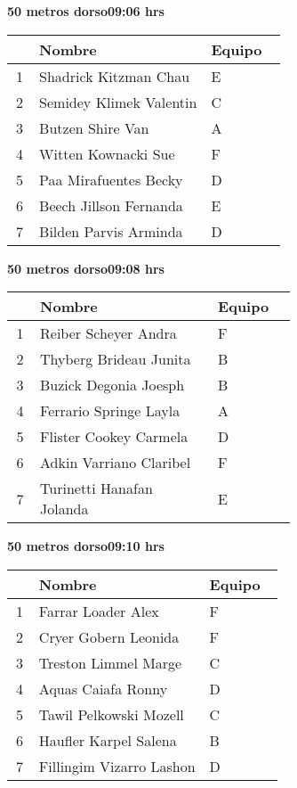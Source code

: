 \begin{minipage}{0.95\linewidth}
\begin{center}
\textbf{
50 metros dorso\hspace{1cm}09:06 hrs}
\end{center}
\begin{tabular}{cp{0.63\linewidth}l}
\hline
& \textbf{Nombre} & \textbf{Equipo} \\ \hline
1 & Shadrick Kitzman Chau & E \\ 
2 & Semidey Klimek Valentin & C \\ 
3 & Butzen Shire Van & A \\ 
4 & Witten Kownacki Sue & F \\ 
5 & Paa Mirafuentes Becky & D \\ 
6 & Beech Jillson Fernanda & E \\ 
7 & Bilden Parvis Arminda & D \\ 
\end{tabular}
\end{minipage}
\begin{minipage}{0.95\linewidth}
\begin{center}
\textbf{
50 metros dorso\hspace{1cm}09:08 hrs}
\end{center}
\begin{tabular}{cp{0.63\linewidth}l}
\hline
& \textbf{Nombre} & \textbf{Equipo} \\ \hline
1 & Reiber Scheyer Andra & F \\ 
2 & Thyberg Brideau Junita & B \\ 
3 & Buzick Degonia Joesph & B \\ 
4 & Ferrario Springe Layla & A \\ 
5 & Flister Cookey Carmela & D \\ 
6 & Adkin Varriano Claribel & F \\ 
7 & Turinetti Hanafan Jolanda & E \\ 
\end{tabular}
\end{minipage}
\begin{minipage}{0.95\linewidth}
\begin{center}
\textbf{
50 metros dorso\hspace{1cm}09:10 hrs}
\end{center}
\begin{tabular}{cp{0.63\linewidth}l}
\hline
& \textbf{Nombre} & \textbf{Equipo} \\ \hline
1 & Farrar Loader Alex & F \\ 
2 & Cryer Gobern Leonida & F \\ 
3 & Treston Limmel Marge & C \\ 
4 & Aquas Caiafa Ronny & D \\ 
5 & Tawil Pelkowski Mozell & C \\ 
6 & Haufler Karpel Salena & B \\ 
7 & Fillingim Vizarro Lashon & D \\ 
\end{tabular}
\end{minipage}
